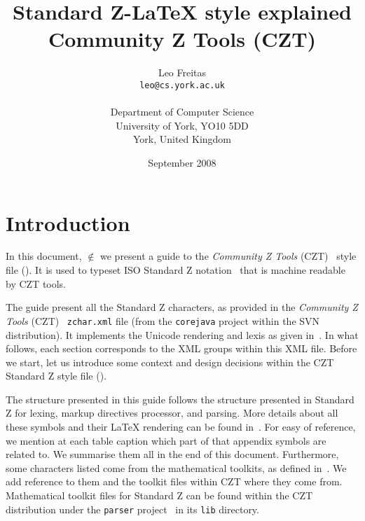 \documentclass{article}
\newcommand{\emfile}[1]{\texttt{#1}}%
\begin{document}
\title{Standard Z-\LaTeX{} style explained\\ Community Z Tools (CZT)}
\author{Leo Freitas \\ \texttt{leo@cs.york.ac.uk} \\ \\ Department of Computer Science \\ University of York, YO10 5DD \\ York, United Kingdom \\ }
\date{September 2008}
\maketitle

\tableofcontents
\listoftables

\section{Introduction}\label{sec:intro}

In this document, $\notin$ we present a guide to the \textit{Community Z Tools} (CZT)~\cite{czt}
style file (\cztstylefile). It is used to typeset ISO Standard Z notation~\cite{isoz} that is
machine readable by CZT tools.

The guide present all the Standard Z characters, as provided in
the \textit{Community Z Tools} (CZT)~\cite{czt} \emfile{zchar.xml} file (from
the \texttt{corejava} project within the SVN distribution). It implements the Unicode
rendering and lexis as given in~\cite[Ch.~6--7]{isoz}. In what follows, each
section corresponds to the XML groups within this XML file. Before we start, let us
introduce some context and design decisions within the CZT Standard Z style file (\cztstylefile).

The structure presented in this guide follows the structure presented in Standard Z for
lexing, markup directives processor, and parsing. More details about all these symbols
and their \LaTeX{} rendering can be found in~\cite[Appendix~A]{isoz}. For easy of
reference, we mention at each table caption which part of that appendix symbols are related to.
We summarise them all in the end of this document.
Furthermore, some characters listed come from the mathematical toolkits, as defined
in~\cite[Appendix~B]{isoz}. We add reference to them and the toolkit files
within CZT where they come from. Mathematical toolkit files for Standard Z can
be found within the CZT distribution under the \texttt{parser} project~\cite{czt} in
its \texttt{lib} directory.
\end{document}
